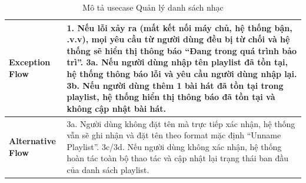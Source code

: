 \documentclass[a4paper]{article}
\begin{document}
\begin{table}[h!]
\begin{tabularx}{\textwidth}{|l|X|}
\textbf{Exception Flow} 
& 1. Nếu lỗi xảy ra (mất kết nối máy chủ, hệ thống bận, .v.v), mọi yêu cầu từ người dùng đều bị từ chối và hệ thống sẽ hiển thị thông báo ``Đang trong quá trình bảo trì''. \newline
  3a. Nếu người dùng nhập tên playlist đã tồn tại, hệ thống thông báo lỗi và yêu cầu người dùng nhập lại. \newline
  3b. Nếu người dùng thêm 1 bài hát đã tồn tại trong playlist, hệ thống hiển thị thông báo đã tồn tại và không cập nhật bài hát. \\ \hline
\textbf{Alternative Flow} 
& 3a. Người dùng không đặt tên mà trực tiếp xác nhận, hệ thống vẫn sẽ ghi nhận và đặt tên theo format mặc định ``Unname Playlist''.\newline
  3c/3d. Nếu người dùng không xác nhận, hệ thống hoàn tác toàn bộ thao tác và cập nhật lại trạng thái ban đầu của danh sách playlist. \\ \hline
\end{tabularx}
\caption{Mô tả usecase Quản lý danh sách nhạc}
\end{table}
\end{document}
